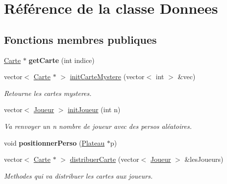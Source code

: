 \hypertarget{classDonnees}{\section{\-Référence de la classe \-Donnees}
\label{classDonnees}
}
\subsection*{\-Fonctions membres publiques}
\begin{DoxyCompactItemize}
\item 
\hypertarget{classDonnees_af238721bd5caba48da9d7531f1156f18}{\hyperlink{classCarte}{\-Carte} $\ast$ {\bfseries get\-Carte} (int indice)}\label{classDonnees_af238721bd5caba48da9d7531f1156f18}

\item 
vector$<$ \hyperlink{classCarte}{\-Carte} $\ast$ $>$ \hyperlink{classDonnees_a574a33fb002aa10927bd97c39b84839b}{init\-Carte\-Mystere} (vector$<$ int $>$ \&vec)
\begin{DoxyCompactList}\small\item\em \-Retourne les cartes mysteres. \end{DoxyCompactList}\item 
vector$<$ \hyperlink{classJoueur}{\-Joueur} $>$ \hyperlink{classDonnees_a85ad060f19a3f27d07699495b8be4fe0}{init\-Joueur} (int n)
\begin{DoxyCompactList}\small\item\em \-Va renvoyer un n nombre de joueur avec des persos aléatoires. \end{DoxyCompactList}\item 
\hypertarget{classDonnees_a1f7c9ce96432a2cb384d4f1fb22c59f7}{void {\bfseries positionner\-Perso} (\hyperlink{classPlateau}{\-Plateau} $\ast$p)}\label{classDonnees_a1f7c9ce96432a2cb384d4f1fb22c59f7}

\item 
vector$<$ \hyperlink{classCarte}{\-Carte} $\ast$ $>$ \hyperlink{classDonnees_ae61912de3804ec0a33be8a3168a41b72}{distribuer\-Carte} (vector$<$ \hyperlink{classJoueur}{\-Joueur} $>$ \&les\-Joueurs)
\begin{DoxyCompactList}\small\item\em \-Methodes qui va distribuer les cartes aux joueurs. \end{DoxyCompactList}\end{DoxyCompactItemize}



